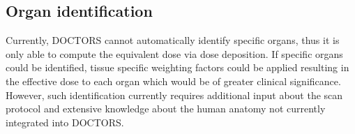 \subsection{Organ identification}
Currently, DOCTORS cannot automatically identify specific organs, thus it is only able to compute the equivalent dose via dose deposition. If specific organs could be identified, tissue specific weighting factors could be applied resulting in the effective dose to each organ which would be of greater clinical significance. However, such identification currently requires additional input about the scan protocol and extensive knowledge about the human anatomy not currently integrated into DOCTORS.

\endinput

